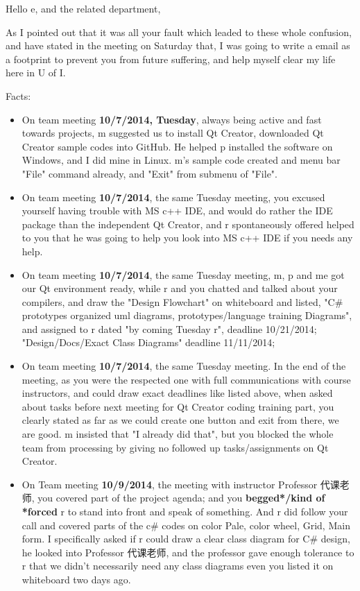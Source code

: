 \documentclass[9pt,b5paper]{article}
\begin{document}
Hello e, and the related department, 

As I pointed out that it was all your fault which leaded to these whole confusion, and have stated in the meeting on Saturday that, I was going to write a email as a footprint to prevent you from future suffering, and help myself clear my life here in U of I. 

Facts:

\begin{itemize}
\item On team meeting \textbf{10/7/2014, Tuesday}, always being active and fast towards projects, m suggested us to install Qt Creator, downloaded Qt Creator sample codes into GitHub. He helped p installed the software on Windows, and I did mine in Linux. m's sample code created and menu bar "File" command already, and "Exit" from submenu of "File".
\item On team meeting \textbf{10/7/2014}, the same Tuesday meeting, you excused yourself having trouble with MS c++ IDE, and would do rather the IDE package than the independent Qt Creator, and r spontaneously offered helped to you that he was going to help you look into MS c++ IDE if you needs any help.

\item On team meeting \textbf{10/7/2014}, the same Tuesday meeting, m, p and me got our Qt environment ready, while r and you chatted and talked about your compilers, and draw the "Design Flowchart" on whiteboard and listed, "C\# prototypes organized uml diagrams, prototypes/language training Diagrams", and assigned to r dated "by coming Tuesday r", deadline 10/21/2014; "Design/Docs/Exact Class Diagrams" deadline 11/11/2014;

\item On team meeting \textbf{10/7/2014}, the same Tuesday meeting. In the end of the meeting, as you were the respected one with full communications with course instructors, and could draw exact deadlines like listed above, when asked about tasks before next meeting for Qt Creator coding training part, you clearly stated as far as we could create one button and exit from there, we are good. m insisted that "I already did that", but you blocked the whole team from processing by giving no followed up tasks/assignments on Qt Creator.

\item On Team meeting \textbf{10/9/2014}, the meeting with instructor Professor 代课老师, you covered part of the project agenda; and you \textbf{begged*/kind of *forced} r to stand into front and speak of something. And r did follow your call and covered parts of the c\# codes on color Pale, color wheel, Grid, Main form. I specifically asked if r could draw a clear class diagram for C\# design, he looked into Professor 代课老师, and the professor gave enough tolerance to r that we didn't necessarily need any class diagrams even you listed it on whiteboard two days ago.


\end{itemize}
\end{document}
